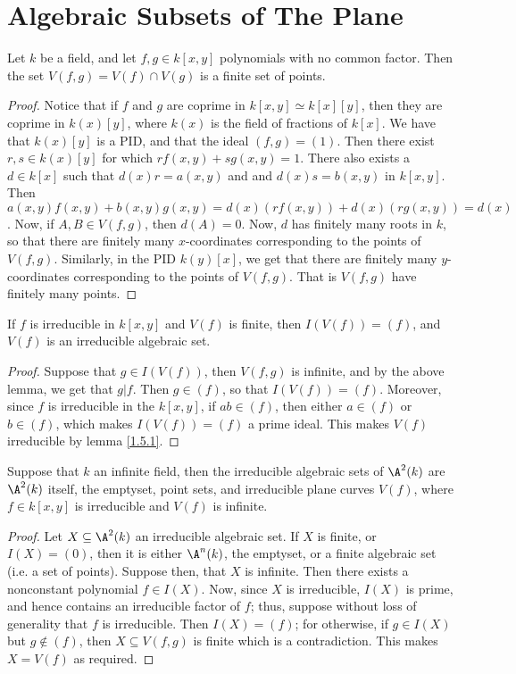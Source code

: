 \section{Algebraic Subsets of The Plane}\label{section_1.6}

\begin{lemma}\label{1.6.1}
    Let $k$ be a field, and let $f,g \in k[x,y]$ polynomials with no common
    factor. Then the set $V(f,g)=V(f) \cap V(g)$ is a finite set of points.
\end{lemma}
\begin{proof}
    Notice that if $f$ and $g$ are coprime in $k[x,y] \simeq k[x][y]$, then they
    are coprime in $k(x)[y]$, where $k(x)$ is the field of fractions of $k[x]$.
    We have that $k(x)[y]$ is a PID, and that the ideal $(f,g)=(1)$. Then there
    exist $r,s \in k(x)[y]$ for which $rf(x,y)+sg(x,y)=1$. There also exists a
    $d \in k[x]$ such that $d(x)r=a(x,y)$ and and $d(x)s=b(x,y)$ in $k[x,y]$.
    Then $a(x,y)f(x,y)+b(x,y)g(x,y)=d(x)(rf(x,y))+d(x)(rg(x,y))=d(x)$. Now, if
    $A,B \in V(f,g)$, then $d(A)=0$. Now, $d$ has finitely many roots in $k$, so
    that there are finitely many $x$-coordinates corresponding to the points of
    $V(f,g)$. Similarly, in the PID $k(y)[x]$, we get that there are finitely
    many $y$-coordinates corresponding to the points of $V(f,g)$. That is
    $V(f,g)$ have finitely many points.
\end{proof}
\begin{corollary}
    If $f$ is irreducible in $k[x,y]$ and $V(f)$ is finite, then $I(V(f))=(f)$,
    and $V(f)$ is an irreducible algebraic set.
\end{corollary}
\begin{proof}
    Suppose that $g \in I(V(f))$, then $V(f,g)$ is infinite, and by the above
    lemma, we get that $g|f$. Then $g \in (f)$, so that $I(V(f))=(f)$. Moreover,
    since $f$ is irreducible in the $k[x,y]$, if $ab \in (f)$, then either $a
    \in (f)$ or $b \in (f)$, which makes $I(V(f))=(f)$ a prime ideal. This makes
    $V(f)$ irreducible by lemma \ref{1.5.1}.
\end{proof}
\begin{corollary}
    Suppose that $k$ an infinite field, then the irreducible algebraic sets of
    $\A^2(k)$ are $\A^2(k)$ itself, the emptyset, point sets, and irreducible
    plane curves $V(f)$, where $f \in k[x,y]$ is irreducible and $V(f)$ is
    infinite.
\end{corollary}
\begin{proof}
    Let $X \subseteq \A^2(k)$ an irreducible algebraic set. If $X$ is finite, or
    $I(X)=(0)$, then it is either $\A^n(k)$, the emptyset, or a finite algebraic
    set (i.e. a set of points). Suppose then, that $X$ is infinite. Then there
    exists a nonconstant polynomial $f \in I(X)$. Now, since $X$ is irreducible,
    $I(X)$ is prime, and hence contains an irreducible factor of $f$; thus,
    suppose without loss of generality that $f$ is irreducible. Then $I(X)=(f)$;
    for otherwise, if $g \in I(X)$ but $g \not\in (f)$, then $X \subseteq
    V(f,g)$ is finite which is a contradiction. This makes $X=V(f)$ as required.
\end{proof}

